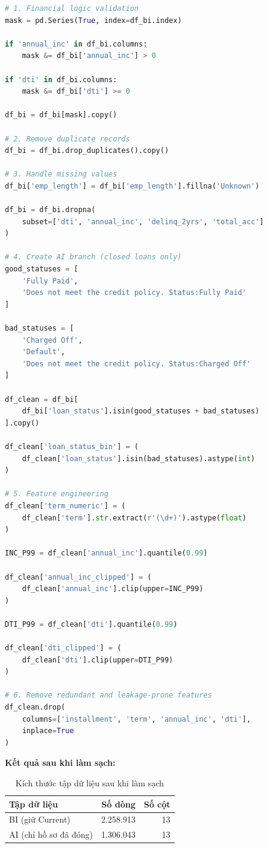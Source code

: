 \begin{lstlisting}[language=Python, caption=Data Cleaning and Transformation Process (Excerpt)]
# 1. Financial logic validation
mask = pd.Series(True, index=df_bi.index)

if 'annual_inc' in df_bi.columns:
    mask &= df_bi['annual_inc'] > 0

if 'dti' in df_bi.columns:
    mask &= df_bi['dti'] >= 0

df_bi = df_bi[mask].copy()

# 2. Remove duplicate records
df_bi = df_bi.drop_duplicates().copy()

# 3. Handle missing values
df_bi['emp_length'] = df_bi['emp_length'].fillna('Unknown')

df_bi = df_bi.dropna(
    subset=['dti', 'annual_inc', 'delinq_2yrs', 'total_acc']
)

# 4. Create AI branch (closed loans only)
good_statuses = [
    'Fully Paid',
    'Does not meet the credit policy. Status:Fully Paid'
]

bad_statuses = [
    'Charged Off',
    'Default',
    'Does not meet the credit policy. Status:Charged Off'
]

df_clean = df_bi[
    df_bi['loan_status'].isin(good_statuses + bad_statuses)
].copy()

df_clean['loan_status_bin'] = (
    df_clean['loan_status'].isin(bad_statuses).astype(int)
)

# 5. Feature engineering
df_clean['term_numeric'] = (
    df_clean['term'].str.extract(r'(\d+)').astype(float)
)

INC_P99 = df_clean['annual_inc'].quantile(0.99)

df_clean['annual_inc_clipped'] = (
    df_clean['annual_inc'].clip(upper=INC_P99)
)

DTI_P99 = df_clean['dti'].quantile(0.99)

df_clean['dti_clipped'] = (
    df_clean['dti'].clip(upper=DTI_P99)
)

# 6. Remove redundant and leakage-prone features
df_clean.drop(
    columns=['installment', 'term', 'annual_inc', 'dti'],
    inplace=True
)
\end{lstlisting}
\textbf{Kết quả sau khi làm sạch:}

\begin{table}[H]
    \centering
    \renewcommand{\arraystretch}{1.2}
    \begin{tabular}{|l|r|r|}
        \hline
        \textbf{Tập dữ liệu} & \textbf{Số dòng} & \textbf{Số cột} \\ \hline
        BI (giữ Current) & 2.258.913 & 13 \\ \hline
        AI (chỉ hồ sơ đã đóng) & 1.306.043 & 13 \\ \hline
    \end{tabular}
    \caption{Kích thước tập dữ liệu sau khi làm sạch}
    \label{tab:clean_data_size}
\end{table}

